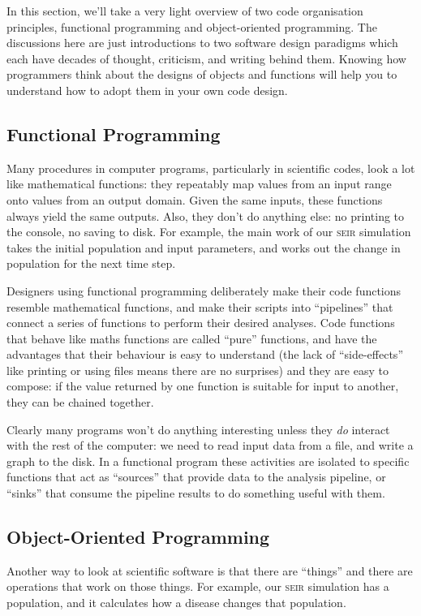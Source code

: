 \documentclass[a4paper]{article}
\begin{document}
In this section, we'll take a very light overview of two code organisation principles, functional programming and object-oriented programming.
The discussions here are just introductions to two software design paradigms which each have decades of thought, criticism, and writing behind them.
Knowing how programmers think about the designs of objects and functions will help you to understand how to adopt them in your own code design.

\subsection{Functional Programming}
Many procedures in computer programs, particularly in scientific codes, look a lot like mathematical functions: they repeatably map values from an input range onto values from an output domain.
Given the same inputs, these functions always yield the same outputs.
Also, they don't do anything else: no printing to the console, no saving to disk.
For example, the main work of our \textsc{seir} simulation takes the initial population and input parameters, and works out the change in population for the next time step.

Designers using functional programming deliberately make their code functions resemble mathematical functions, and make their scripts into ``pipelines'' that connect a series of functions to perform their desired analyses.
Code functions that behave like maths functions are called ``pure'' functions, and have the advantages that their behaviour is easy to understand (the lack of ``side-effects'' like printing or using files means there are no surprises) and they are easy to compose: if the value returned by one function is suitable for input to another, they can be chained together.

Clearly many programs won't do anything interesting unless they \emph{do} interact with the rest of the computer: we need to read input data from a file, and write a graph to the disk.
In a functional program these activities are isolated to specific functions that act as ``sources'' that provide data to the analysis pipeline, or ``sinks'' that consume the pipeline results to do something useful with them.

\subsection{Object-Oriented Programming}
Another way to look at scientific software is that there are ``things'' and there are operations that work on those things.
For example, our \textsc{seir} simulation has a population, and it calculates how a disease changes that population.
\end{document}
